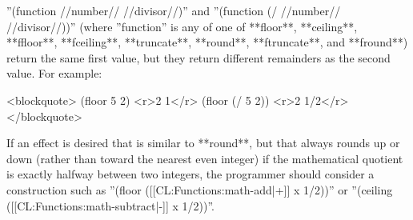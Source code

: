 ''(function //number// //divisor//)'' and ''(function (/ //number// //divisor//))'' (where ''function'' is any of one of **floor**, **ceiling**, **ffloor**, **fceiling**, **truncate**, **round**, **ftruncate**, and **fround**) return the same first value, but they return different remainders as the second value. For example:

<blockquote>
(floor 5 2) <r>2
1</r>
(floor (/ 5 2)) <r>2
1/2</r>
</blockquote>

If an effect is desired that is similar to **round**, but that always rounds up or down (rather than toward the nearest even integer) if the mathematical quotient is exactly halfway between two integers, the programmer should consider a construction such as ''(floor ([[CL:Functions:math-add|+]] x 1/2))'' or ''(ceiling ([[CL:Functions:math-subtract|-]] x 1/2))''.
